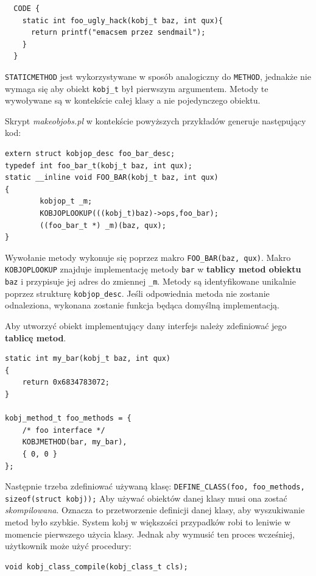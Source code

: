 \documentclass[shortabstract,inz]{iithesis}
\begin{document}
\begin{lstlisting}
  CODE {
    static int foo_ugly_hack(kobj_t baz, int qux){
      return printf("emacsem przez sendmail");
    }
  }
\end{lstlisting}

\texttt{STATICMETHOD} jest wykorzystywane w sposób analogiczny do \texttt{METHOD},
jednakże nie wymaga się aby obiekt \texttt{kobj\_t} był pierwszym argumentem.
Metody te wywoływane są w kontekście całej klasy a nie pojedynczego obiektu.


Skrypt \textit{makeobjobs.pl} w kontekście powyższych przykładów generuje następujący kod:

\begin{lstlisting}[caption=Część kodu z wygenerowanego pliku nagłówkowego]
extern struct kobjop_desc foo_bar_desc;
typedef int foo_bar_t(kobj_t baz, int qux);
static __inline void FOO_BAR(kobj_t baz, int qux)
{
        kobjop_t _m;
        KOBJOPLOOKUP(((kobj_t)baz)->ops,foo_bar);
        ((foo_bar_t *) _m)(baz, qux);
}
\end{lstlisting}

Wywołanie metody wykonuje się poprzez makro \texttt{FOO\_BAR(baz, qux)}.
Makro \texttt{KOBJOPLOOKUP} znajduje implementację metody \texttt{bar} w \textbf{tablicy metod 
obiektu} \texttt{baz} i przypisuje jej adres do zmiennej \texttt{\_m}.
Metody są identyfikowane unikalnie poprzez strukturę \texttt{kobjop\_desc}.
Jeśli odpowiednia metoda nie zostanie odnaleziona, wykonana zostanie funkcja będąca
domyślną implementacją.


Aby utworzyć obiekt implementujący dany interfejs należy zdefiniować jego \textbf{tablicę metod}.

\begin{lstlisting}
static int my_bar(kobj_t baz, int qux)
{
	return 0x6834783072;
}

kobj_method_t foo_methods = {
	/* foo interface */
	KOBJMETHOD(bar, my_bar),
	{ 0, 0 }
};
\end{lstlisting}

Następnie trzeba zdefiniować używaną klasę:
\texttt{DEFINE\_CLASS(foo, foo\_methods, sizeof(struct kobj));}
Aby używać obiektów danej klasy musi ona zostać \textit{skompilowana}.
Oznacza to przetworzenie definicji danej klasy, aby wyszukiwanie metod było
szybkie. System kobj w większości przypadków robi to leniwie w momencie pierwszego
użycia klasy.
Jednak aby wymusić ten proces wcześniej, użytkownik może użyć procedury:

\begin{lstlisting}
void kobj_class_compile(kobj_class_t cls);
\end{lstlisting}
\end{document}
